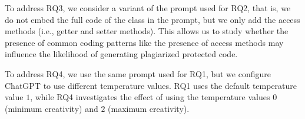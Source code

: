 To address RQ3, we consider a variant of the prompt used for RQ2, that is, we do not embed the full code of the class in the prompt, but we only add the access methods (i.e., getter and setter methods). This allows us to study whether the presence of common coding patterns like the presence of access methods may influence the likelihood of generating plagiarized protected code. 



To address RQ4, we use the same prompt used for RQ1, but we configure ChatGPT to use different temperature values. RQ1 uses the default temperature value $1$, while RQ4 investigates the effect of using the temperature values $0$ (minimum creativity) and $2$ (maximum creativity).





